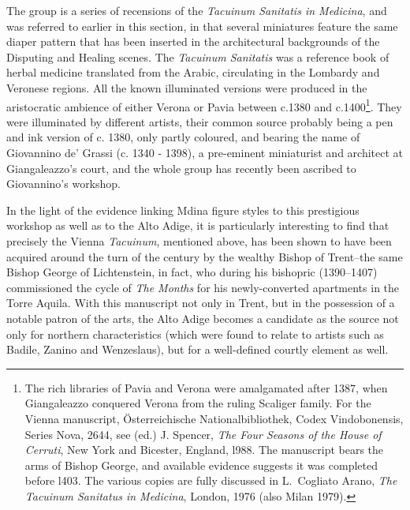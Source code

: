 \documentclass[a4paper,12pt]{article}
\begin{document}
The group is a
series of recensions of the \textit{Tacuinum Sanitatis in Medicina},
and was referred to earlier in this section, in that several
miniatures feature the same diaper pattern that has been inserted in
the architectural backgrounds of the Disputing and Healing scenes. The
\textit{Tacuinum Sanitatis} was a reference book of herbal medicine
translated from the Arabic, circulating in the Lombardy and Veronese
regions. All the known illuminated versions were produced in the
aristocratic ambience of either Verona or Pavia between c.1380 and
c.1400\footnote{The rich libraries of Pavia and Verona were
amalgamated after 1387, when Giangaleazzo conquered Verona from the
ruling Scaliger family. For the Vienna manuscript, \"Osterreichische
Nationalbibliothek, Codex Vindobonensis, Series Nova, 2644, see (ed.)
J. Spencer, \textit{The Four Seasons of the House of Cerruti}, New
York and Bicester, England, l988.  The manuscript bears the arms of
Bishop George, and available evidence suggests it was completed before
l403. The various copies are fully discussed in L.~Cogliato Arano,
\textit{The Tacuinum Sanitatus in Medicina}, London, 1976 (also Milan
1979).}. They were illuminated by different artists, their common
source probably being a pen and ink version of c. 1380, only partly
coloured, and bearing the name of Giovannino de' Grassi (c. 1340 -
1398), a pre-eminent miniaturist and architect at Giangaleazzo's
court, and the whole group has recently been ascribed to Giovannino's
workshop.

In the light of the evidence linking Mdina figure styles to this
prestigious workshop as well as to the Alto Adige, it is particularly
interesting to find that precisely the Vienna \textit{Tacuinum},
mentioned above, has been shown to have been acquired around the turn
of the century by the wealthy Bishop of Trent--the same Bishop George
of Lichtenstein, in fact, who during his bishopric (1390--1407)
commissioned the cycle of \textit{The Months} for his newly-converted
apartments in the Torre Aquila. With this manuscript not only in
Trent, but in the possession of a notable patron of the arts, the Alto
Adige becomes a candidate as the source not only for northern
characteristics (which were found to relate to artists such as Badile,
Zanino and Wenzeslaus), but for a well-defined courtly element as
well.
\end{document}
